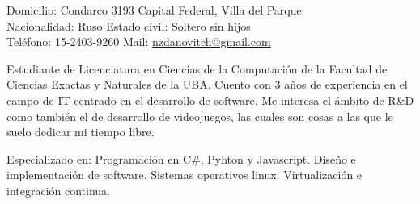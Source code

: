 \documentclass[10pt,a4paper]{article}
\begin{document}
\sloppy  %



\nobreakvspace{0.3em}  %

\noindent
Domicilio: Condarco 3193 \sbull Capital Federal, Villa del Parque \\
Nacionalidad: Ruso \sbull
Estado civil: Soltero sin hijos \\
Teléfono: 15-2403-9260 \sbull
Mail: \href{mailto:nzdanovitch.at.gmail.dot.com}{nzdanovitch\mbox{}@\mbox{}gmail.com}


\spacedhrule{1.2em}{-0.4em}  %



\vspace{-1.3em}  %
\begin{multicols}{2}  %
\noindent 
Estudiante de Licenciatura en Ciencias de la Computación de la Facultad de Ciencias Exactas y Naturales de la UBA.
Cuento con 3 años de experiencia en el campo de IT centrado en el desarrollo de software.
Me interesa el ámbito de R\&D como también el de desarrollo de videojuegos, las cuales son cosas a las que le suelo dedicar mi tiempo libre.
\end{multicols}


\spacedhrule{0.3em}{-0.4em}


\inlineheadsection  %
  {Especializado en:}
  {Programación en C\#, Pyhton y Javascript. Diseño e implementación de software. Sistemas operativos linux. Virtualización e integración continua.}
\end{document}
